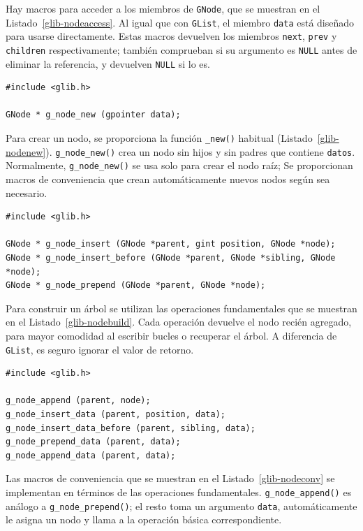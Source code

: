 Hay macros para acceder a los miembros de \lstinline{GNode}, que se muestran en el Listado~\ref{glib-nodeaccess}. Al igual que con \lstinline{GList}, el miembro \lstinline{data} está diseñado para usarse directamente. Estas macros devuelven los miembros \lstinline{next}, \lstinline{prev} y \lstinline{children} respectivamente; también comprueban si su argumento es \lstinline{NULL} antes de eliminar la referencia, y devuelven \lstinline{NULL} si lo es.

\begin{lstlisting}[float, caption={Creating a \lstinline{GNode}}, label=glib-nodenew]
#include <glib.h>

GNode * g_node_new (gpointer data);
\end{lstlisting}

Para crear un nodo, se proporciona la función \lstinline{_new()} habitual (Listado~\ref{glib-nodenew}). \lstinline{g_node_new()} crea un nodo sin hijos y sin padres que contiene \lstinline{datos}. Normalmente, \lstinline{g_node_new()} se usa solo para crear el nodo raíz; Se proporcionan macros de conveniencia que crean automáticamente nuevos nodos según sea necesario.

\begin{lstlisting}[float, caption={Building a \lstinline{GNode} tree}, label=glib-nodebuild]
#include <glib.h>

GNode * g_node_insert (GNode *parent, gint position, GNode *node);
GNode * g_node_insert_before (GNode *parent, GNode *sibling, GNode *node);
GNode * g_node_prepend (GNode *parent, GNode *node);
\end{lstlisting}

Para construir un árbol se utilizan las operaciones fundamentales que se muestran en el Listado~\ref{glib-nodebuild}. Cada operación devuelve el nodo recién agregado, para mayor comodidad al escribir bucles o recuperar el árbol. A diferencia de \lstinline{GList}, es seguro ignorar el valor de retorno.

\begin{lstlisting}[float, caption={Building a \lstinline{GNode}}, label=glib-nodeconv]
#include <glib.h>

g_node_append (parent, node);
g_node_insert_data (parent, position, data);
g_node_insert_data_before (parent, sibling, data);
g_node_prepend_data (parent, data);
g_node_append_data (parent, data);
\end{lstlisting}

Las macros de conveniencia que se muestran en el Listado~\ref{glib-nodeconv} se implementan en términos de las operaciones fundamentales. \lstinline{g_node_append()} es análogo a \lstinline{g_node_prepend()}; el resto toma un argumento \lstinline{data}, automáticamente le asigna un nodo y llama a la operación básica correspondiente.

